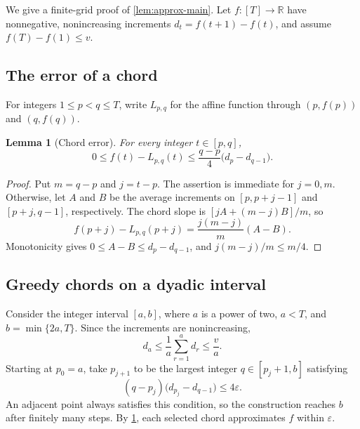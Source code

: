 \documentclass[11pt]{article}
\newtheorem{lemma}[lemma]{Lemma}
\theoremstyle{remark}
\begin{document}
We give a finite-grid proof of \cref{lem:approx-main}.  Let
$f:[T]\to\mathbb R$ have nonnegative, nonincreasing increments
$d_t=f(t+1)-f(t)$, and assume $f(T)-f(1)\le v$.

\subsection{The error of a chord}

For integers $1\le p<q\le T$, write $L_{p,q}$ for the affine function
through $(p,f(p))$ and $(q,f(q))$.

\begin{samepage}
\begin{lemma}[Chord error]\label{lem:chord-app}
For every integer $t\in[p,q]$,
\begin{equation}\label{eq:chord-app}
0\le f(t)-L_{p,q}(t)
\le \frac{q-p}{4}\bigl(d_p-d_{q-1}\bigr).
\end{equation}
\end{lemma}
\end{samepage}

\begin{proof}
Put $m=q-p$ and $j=t-p$.  The assertion is immediate for $j=0,m$.
Otherwise, let $A$ and $B$ be the average increments on
$[p,p+j-1]$ and $[p+j,q-1]$, respectively.  The chord slope is
$[jA+(m-j)B]/m$, so
\[
f(p+j)-L_{p,q}(p+j)
=\frac{j(m-j)}m(A-B).
\]
Monotonicity gives $0\le A-B\le d_p-d_{q-1}$, and
$j(m-j)/m\le m/4$.
\end{proof}

\subsection{Greedy chords on a dyadic interval}

Consider the integer interval $[a,b]$, where $a$ is a power of two,
$a<T$, and $b=\min\{2a,T\}$.  Since the increments are nonincreasing,
\begin{equation}\label{eq:slope-envelope-app}
d_a\le \frac1a\sum_{r=1}^a d_r\le\frac va.
\end{equation}
Starting at $p_0=a$, take $p_{j+1}$ to be the largest integer
$q\in[p_j+1,b]$ satisfying
\begin{equation}\label{eq:greedy-condition-app}
(q-p_j)\bigl(d_{p_j}-d_{q-1}\bigr)\le4\varepsilon.
\end{equation}
An adjacent point always satisfies this condition, so the construction
reaches $b$ after finitely many steps.  By \cref{lem:chord-app},
each selected chord approximates $f$ within $\varepsilon$.
\end{document}
